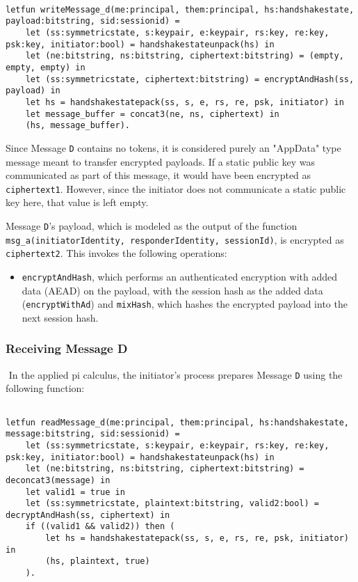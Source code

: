 \begin{lstlisting}

letfun writeMessage_d(me:principal, them:principal, hs:handshakestate, payload:bitstring, sid:sessionid) =
	let (ss:symmetricstate, s:keypair, e:keypair, rs:key, re:key, psk:key, initiator:bool) = handshakestateunpack(hs) in
	let (ne:bitstring, ns:bitstring, ciphertext:bitstring) = (empty, empty, empty) in
	let (ss:symmetricstate, ciphertext:bitstring) = encryptAndHash(ss, payload) in
	let hs = handshakestatepack(ss, s, e, rs, re, psk, initiator) in
	let message_buffer = concat3(ne, ns, ciphertext) in
	(hs, message_buffer).

\end{lstlisting}

Since Message \texttt{D} contains no tokens, it is considered purely an "AppData" type message meant to transfer encrypted payloads.
If a static public key was communicated as part of this message, it would have been encrypted as \texttt{ciphertext1}. However, since the initiator does not communicate a static public key here, that value is left empty.


Message \texttt{D}'s payload, which is modeled as the output of the function \texttt{msg\_a(initiatorIdentity, responderIdentity, sessionId)}, is encrypted as \texttt{ciphertext2}. This invokes the following operations:


\begin{itemize}

\item \texttt{encryptAndHash}, which performs an authenticated encryption with added data (AEAD) on the payload, with the session hash as the added data (\texttt{encryptWithAd}) and \texttt{mixHash}, which hashes the encrypted payload into the next session hash.

\end{itemize}
\subsubsection{Receiving Message D}$ $
In the applied pi calculus, the initiator's process prepares Message \texttt{D} using the following function:


\begin{lstlisting}

letfun readMessage_d(me:principal, them:principal, hs:handshakestate, message:bitstring, sid:sessionid) =
	let (ss:symmetricstate, s:keypair, e:keypair, rs:key, re:key, psk:key, initiator:bool) = handshakestateunpack(hs) in
	let (ne:bitstring, ns:bitstring, ciphertext:bitstring) = deconcat3(message) in
	let valid1 = true in
	let (ss:symmetricstate, plaintext:bitstring, valid2:bool) = decryptAndHash(ss, ciphertext) in
	if ((valid1 && valid2)) then (
		let hs = handshakestatepack(ss, s, e, rs, re, psk, initiator) in
		(hs, plaintext, true)
	).

\end{lstlisting}

